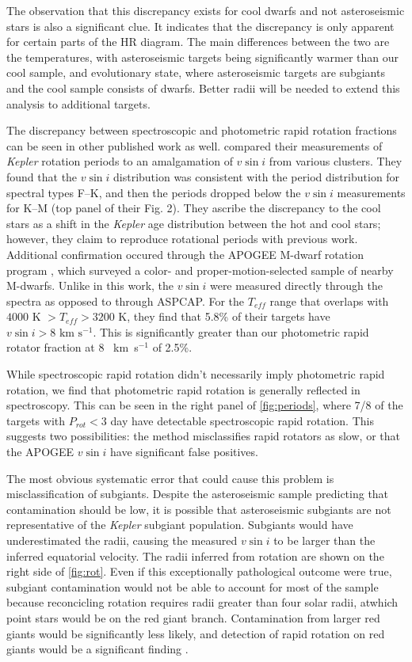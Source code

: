 \documentclass[manuscript]{aastex6}
\newcommand{\vsini}{\ensuremath{v \sin i}}
\newcommand{\Kepler}{\mbox{\textit{Kepler}}}
\newcommand{\Teff}{\ensuremath{T_{eff}}}
\newcommand{\kms}{\textrm{~km~s}\ensuremath{^{-1}}}
\begin{document}
The observation that this discrepancy exists for cool dwarfs and not
asteroseismic stars is also a significant clue. It indicates that the
discrepancy is only apparent for certain parts of the HR diagram. The main
differences between the two are the temperatures, with asteroseismic targets
being significantly warmer than our cool sample, and evolutionary state, where
asteroseismic targets are subgiants and the cool sample consists of dwarfs.
Better radii will be needed to extend this analysis to additional targets.

The discrepancy between spectroscopic and 
photometric rapid rotation fractions can be seen in other published work as well. 
\citet{Nielsen13} compared their measurements of \Kepler{} rotation periods to
an amalgamation of \vsini{} from various clusters. They found that the
\vsini{} distribution was consistent with the period distribution for spectral
types F--K, and then the periods dropped below the \vsini{} measurements for
K--M (top panel of their Fig. 2). They ascribe the discrepancy to the cool
stars as a shift in the \Kepler{} age distribution between the hot and cool
stars; however, they claim to reproduce rotational periods with previous work. 
Additional confirmation occured through the APOGEE M-dwarf rotation
program \citep{Gilhool18}, which surveyed a color- and proper-motion-selected 
sample of nearby M-dwarfs. Unlike in this work, the \vsini{} were measured 
directly through the spectra as opposed to through ASPCAP\@. For the \Teff{} range that
overlaps with \citet{McQuillan14} \(4000 \textrm{ K } > \Teff > 3200\) K, they 
find that 5.8\% of their targets have \(\vsini > 8 \kms\). This is 
significantly greater than our photometric rapid rotator fraction at 8 \kms{} 
of 2.5\%. 

While spectroscopic rapid rotation didn't necessarily imply photometric
rapid rotation, we find that photometric rapid rotation is generally
reflected in spectroscopy. This can be seen in the right panel of
\cref{fig:periods}, where 7/8 of the targets with \(P_{rot} < 3\) day
have detectable spectroscopic rapid rotation. This suggests two
possibilities: the \citep{McQuillan14} method misclassifies rapid
rotators as slow, or that the APOGEE \vsini{} have significant false
positives.

The most obvious systematic error that could cause this problem is
misclassification of subgiants. Despite the asteroseismic sample
predicting that contamination should be low, it is possible that 
asteroseismic subgiants are not representative of the \Kepler{} subgiant 
population. Subgiants would have underestimated the radii, causing the 
measured \vsini{} to be larger than the inferred equatorial velocity.
The radii inferred from rotation are shown on the right side of
\cref{fig:rot}. Even if this
exceptionally pathological outcome were true, subgiant contamination
would not be able to account for most of the sample because reconcicling
rotation requires radii greater than four solar radii, atwhich point
stars would be on the red giant branch. Contamination from larger red giants 
would be significantly less likely, and detection of rapid rotation on red 
giants would be a significant finding \citep{Tayar15}.
\end{document}
